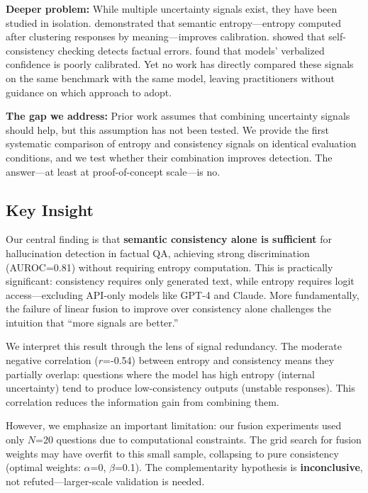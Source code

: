 \textbf{Deeper problem:} While multiple uncertainty signals exist, they have been studied in isolation. \citet{kuhn2023semantic} demonstrated that semantic entropy---entropy computed after clustering responses by meaning---improves calibration. \citet{manakul2023selfcheckgpt} showed that self-consistency checking detects factual errors. \citet{xiong2023can} found that models' verbalized confidence is poorly calibrated. Yet no work has directly compared these signals on the same benchmark with the same model, leaving practitioners without guidance on which approach to adopt.

\textbf{The gap we address:} Prior work assumes that combining uncertainty signals should help, but this assumption has not been tested. We provide the first systematic comparison of entropy and consistency signals on identical evaluation conditions, and we test whether their combination improves detection. The answer---at least at proof-of-concept scale---is no.

\subsection{Key Insight}

Our central finding is that \textbf{semantic consistency alone is sufficient} for hallucination detection in factual QA, achieving strong discrimination (AUROC=0.81) without requiring entropy computation. This is practically significant: consistency requires only generated text, while entropy requires logit access---excluding API-only models like GPT-4 and Claude. More fundamentally, the failure of linear fusion to improve over consistency alone challenges the intuition that ``more signals are better.''

We interpret this result through the lens of signal redundancy. The moderate negative correlation ($r$=-0.54) between entropy and consistency means they partially overlap: questions where the model has high entropy (internal uncertainty) tend to produce low-consistency outputs (unstable responses). This correlation reduces the information gain from combining them.

However, we emphasize an important limitation: our fusion experiments used only $N$=20 questions due to computational constraints. The grid search for fusion weights may have overfit to this small sample, collapsing to pure consistency (optimal weights: $\alpha$=0, $\beta$=0.1). The complementarity hypothesis is \textbf{inconclusive}, not refuted---larger-scale validation is needed.

